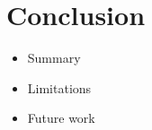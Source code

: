 \chapter{Conclusion}
\begin{itemize}
    \item Summary
    \item Limitations
    \item Future work
\end{itemize}